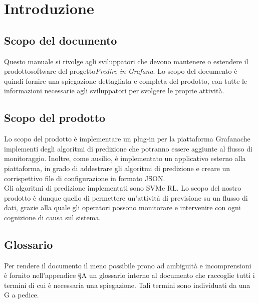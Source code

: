 \section{Introduzione}
\subsection{Scopo del documento}
Questo manuale si rivolge agli sviluppatori che devono mantenere o estendere il prodotto\glosp software del progetto\glosp \textit{Predire in Grafana}. Lo scopo del documento è quindi fornire una spiegazione dettagliata e completa del prodotto\glo, con tutte le informazioni necessarie agli sviluppatori per svolgere le proprie attività.

\subsection{Scopo del prodotto}
Lo scopo del prodotto è implementare un plug-in per la piattaforma Grafana\glosp che implementi degli algoritmi di predizione che potranno essere aggiunte al flusso di monitoraggio. Inoltre, come ausilio, è implementato un applicativo esterno alla piattaforma, in grado di addestrare gli algoritmi di predizione e creare un corrispettivo file di configurazione in formato JSON. \\
Gli algoritmi di predizione implementati sono SVM\glosp e RL\glo.
Lo scopo del nostro prodotto è dunque quello di permettere un'attività di previsione su un flusso di dati, grazie alla quale gli operatori possono monitorare e intervenire con ogni cognizione di causa sul sistema.

\subsection{Glossario}
Per rendere il documento il meno possibile prono ad ambiguità e incomprensioni è fornito nell'appendice §A un glossario interno al documento che raccoglie tutti i termini di cui è necessaria una spiegazione. Tali termini sono individuati da una G a pedice.

